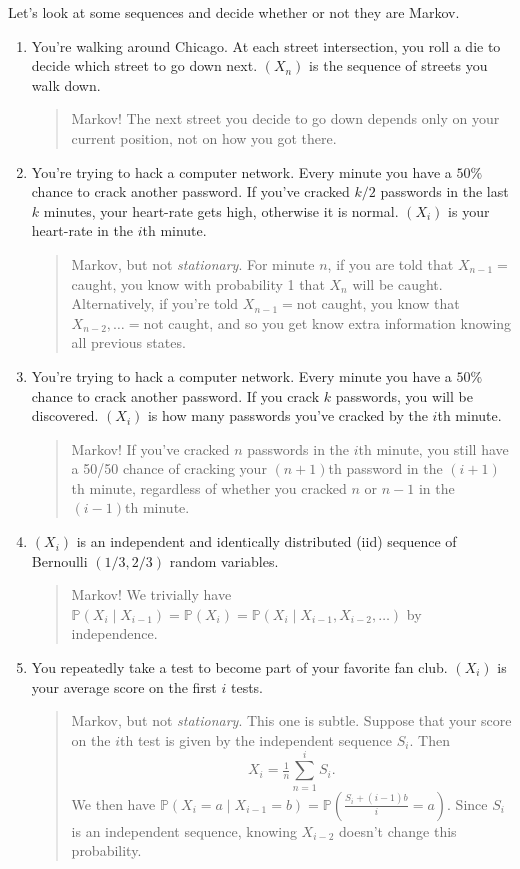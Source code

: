 \documentclass{problemset}
\newcommand{\1}{\mathbf{1}}
\renewcommand{\P}{\mathbb{P}}
\begin{document}
	Let's look at some sequences and decide whether or not they are Markov.


	\begin{enumerate}
		\item You're walking around Chicago.  At each street intersection, you
			roll a die to decide which street to go down next.
			$(X_n)$ is the sequence of streets you walk down.
			\begin{quote}
				Markov!  The next street you decide to go down depends only
				on your current position, not on how you got there.
			\end{quote}
		\item You're trying to hack a computer network.  Every minute you have a $50\%$ chance
			to crack another password.  If you've cracked $k/2$ passwords in the last $k$ minutes, 
			your heart-rate gets high, otherwise it is normal.  $(X_i)$ is your heart-rate
			in the $i$th minute.
			\begin{quote}
				Markov, but not \emph{stationary}.  For minute $n$, if you are
				told that $X_{n-1}=$caught, you know with probability 1 that $X_n$ will
				be caught.  Alternatively, if you're told $X_{n-1}=$not caught, you know
				that $X_{n-2},\ldots=$not caught, and so you get know extra information
				knowing all previous states.
			\end{quote}
		\item You're trying to hack a computer network.  Every minute you have a $50\%$ chance
			to crack another password.  If you crack $k$ passwords, 
			you will be discovered.  $(X_i)$ is how many passwords you've
			cracked by the $i$th minute.
			\begin{quote}
				Markov! If you've cracked $n$ passwords in the $i$th minute, 
				you still have a 50/50 chance of cracking your $(n+1)$th password in the $(i+1)$th
				minute, regardless of whether you cracked $n$ or $n-1$ in the $(i-1)$th minute.
			\end{quote}
		\item $(X_i)$ is an independent and identically distributed (iid) sequence of Bernoulli
			$(1/3,2/3)$ random variables.
			\begin{quote}
				Markov!  We trivially have $\P(X_i\mid X_{i-1}) = \P(X_i) = \P(X_i\mid X_{i-1}, X_{i-2},\ldots)$ by independence.
			\end{quote}
		\item You repeatedly take a test to become part of your favorite fan club.  $(X_i)$ is your average 
			score on the first $i$ tests.
			\begin{quote}
				Markov, but not \emph{stationary}.  This one is subtle.  Suppose that your
				score on the $i$th test is given by the independent sequence $S_i$.  Then
				\[
					X_i = \tfrac{1}{n}\sum_{n=1}^i S_i.
				\]
				We then have $\P(X_i=a\mid X_{i-1}=b) = \P\left(\frac{S_i+(i-1)b}{i} = a\right)$.  Since $S_i$ 
				is an independent sequence, knowing $X_{i-2}$ doesn't change this probability.
			\end{quote}
	\end{enumerate}
\end{document}
